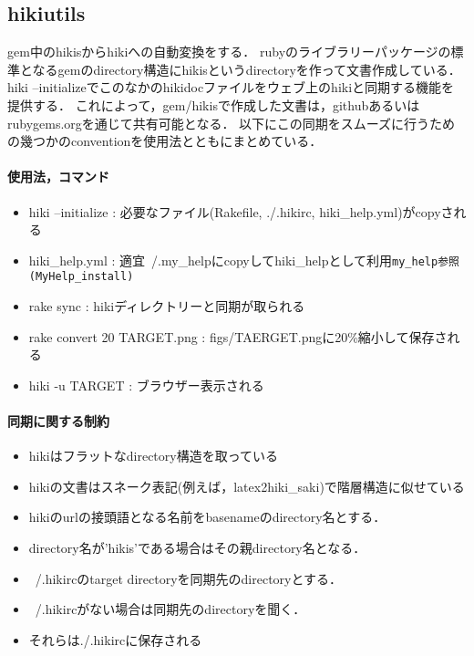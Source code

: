 \subsection{hikiutils}
gem中のhikisからhikiへの自動変換をする．
rubyのライブラリーパッケージの標準となるgemのdirectory構造にhikisというdirectoryを作って文書作成している．hiki --initializeでこのなかのhikidocファイルをウェブ上のhikiと同期する機能を提供する．
これによって，gem/hikisで作成した文書は，githubあるいはrubygems.orgを通じて共有可能となる．
以下にこの同期をスムーズに行うための幾つかのconventionを使用法とともにまとめている．

\paragraph{使用法，コマンド}
\begin{itemize}
\item hiki --initialize : 必要なファイル(Rakefile, ./.hikirc, hiki\_help.yml)がcopyされる
\item hiki\_help.yml : 適宜~/.my\_helpにcopyしてhiki\_helpとして利用\verb|my_help参照(MyHelp_install)|
\item rake sync : hikiディレクトリーと同期が取られる
\item rake convert 20 TARGET.png : figs/TAERGET.pngに20\%縮小して保存される
\item hiki -u TARGET : ブラウザー表示される
\end{itemize}

\paragraph{同期に関する制約}
\begin{itemize}
\item hikiはフラットなdirectory構造を取っている
\item hikiの文書はスネーク表記(例えば，latex2hiki\_saki)で階層構造に似せている
\item hikiのurlの接頭語となる名前をbasenameのdirectory名とする．
\item directory名が'hikis'である場合はその親directory名となる．
\item ~/.hikircのtarget directoryを同期先のdirectoryとする．
\item ~/.hikircがない場合は同期先のdirectoryを聞く．
\item それらは./.hikircに保存される
\end{itemize}
